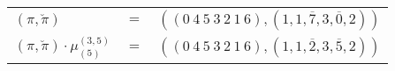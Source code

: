 \begin{example}\label{example:NLNYPHRB}
  \hfill
  \begin{\position}
    \begin{tabular}{lll}
      $(\pi,\breve\pi)$ & $=$ & $(({0}~{4}~{5}~{3}~{2}~{1}~{6}),(1,1,\overline{7},3,\overline{0},2))$ \\
      $(\pi,\breve\pi) \cdot \mu^{(3,5)}_{(5)}$ & $=$ & $(({0}~{4}~{5}~{3}~{2}~{1}~{6}),(1,1,\overline{2},3,\overline{5},2))$ \\
    \end{tabular}
  \end{\position}
\end{example}